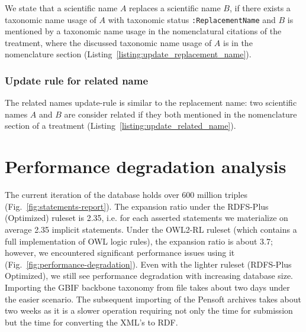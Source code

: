 We state that a scientific name $A$ replaces a scientific name $B$, if there exists a taxonomic name usage of $A$ with taxonomic status {\tt :ReplacementName} and $B$ is mentioned by a taxonomic name usage in the nomenclatural citations of the treatment, where the discussed taxonomic name usage of $A$ is in the nomenclature section (Listing~\ref{listing:update_replacement_name}).



\subsubsection{Update rule for related name}

The related names update-rule is similar to the replacement name: two scientific names $A$ and $B$ are consider related if they both mentioned in the nomenclature section of a treatment (Listing~\ref{listing:update_related_name}).



\section{Performance degradation analysis}

The current iteration of the database holds over 600 million triples (Fig.~\ref{fig:statements-report}). The expansion ratio under the RDFS-Plus (Optimized) ruleset is 2.35, i.e. for each asserted statements we materialize on average 2.35 implicit statements. Under the OWL2-RL ruleset (which contains a full implementation of OWL logic rules), the expansion ratio is about 3.7; however, we encountered significant performance issues using it (Fig.~\ref{fig:performance-degradation}). Even with the lighter ruleset (RDFS-Plus Optimized), we still see performance degradation with increasing database size. Importing the GBIF backbone taxonomy from file takes about two days under the easier scenario. The subsequent importing of the Pensoft archives takes about two weeks as it is a slower operation requiring not only the time for submission but the time for converting the XML's to RDF.

